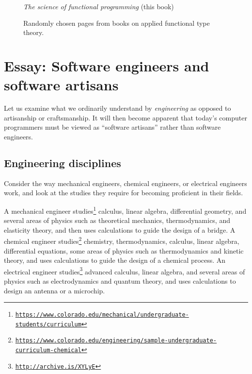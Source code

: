 \begin{figure}
\begin{centering}
\emph{The science of functional programming} (this book)
\par\end{centering}
\vspace{1\baselineskip}

\caption{Randomly chosen pages from books on applied functional type theory.\label{fig:Randomly-chosen-pages}}
\end{figure}


\chapter{Essay: Software engineers and software artisans}

Let us examine what we ordinarily understand by \emph{engineering}
as opposed to artisanship or craftsmanship. It will then become apparent
that today\textsf{'}s computer programmers must be viewed as \textsf{``}software artisans\textsf{''}
rather than software engineers.

\section{Engineering disciplines }

Consider the way mechanical engineers, chemical engineers, or electrical
engineers work, and look at the studies they require for becoming
proficient in their fields.

A mechanical engineer studies\footnote{\texttt{\href{https://www.colorado.edu/mechanical/undergraduate-students/curriculum}{https://www.colorado.edu/mechanical/undergraduate-students/curriculum}}}
calculus, linear algebra, differential geometry, and several areas
of physics such as theoretical mechanics, thermodynamics, and elasticity
theory, and then uses calculations to guide the design of a bridge.
A chemical engineer studies\footnote{\texttt{\href{https://www.colorado.edu/engineering/sample-undergraduate-curriculum-chemical}{https://www.colorado.edu/engineering/sample-undergraduate-curriculum-chemical}}}
chemistry, thermodynamics, calculus, linear algebra, differential
equations, some areas of physics such as thermodynamics and kinetic
theory, and uses calculations to guide the design of a chemical process.
An electrical engineer studies\footnote{\texttt{\href{http://archive.is/XYLyE}{http://archive.is/XYLyE}}}
advanced calculus, linear algebra, and several areas of physics such
as electrodynamics and quantum theory, and uses calculations to design
an antenna or a microchip.

